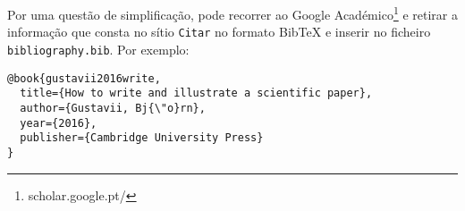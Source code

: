 Por uma questão de simplificação, pode recorrer ao  Google Académico\footnote{scholar.google.pt/} e retirar a informação que consta no sítio \texttt{Citar} no formato BibTeX e inserir no ficheiro \texttt{bibliography.bib}. Por exemplo:
\begin{verbatim}
@book{gustavii2016write,
  title={How to write and illustrate a scientific paper},
  author={Gustavii, Bj{\"o}rn},
  year={2016},
  publisher={Cambridge University Press}
}
\end{verbatim}